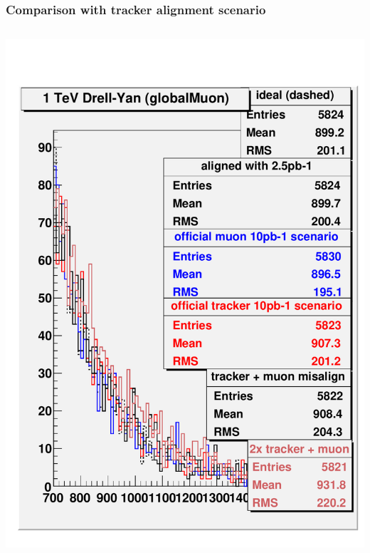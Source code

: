 \documentclass[compress]{beamer}
\begin{document}
\begin{frame}
\frametitle{Comparison with tracker alignment scenario}
\begin{columns}
\includegraphics[width=\linewidth]{trackercompare_dy_500.pdf}

\end{columns}
\end{frame}
\end{document}
